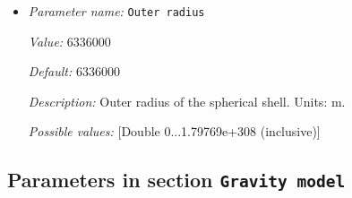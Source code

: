 \begin{itemize}
{\it Default:} 360


{\it Description:} Opening angle in degrees of the section of the shell that we want to build. Units: degrees.


{\it Possible values:} [Double 0...360 (inclusive)]
\item {\it Parameter name:} {\tt Outer radius}
\label{parameters:Geometry model/Spherical shell/Outer radius}


{\it Value:} 6336000


{\it Default:} 6336000


{\it Description:} Outer radius of the spherical shell. Units: m.


{\it Possible values:} [Double 0...1.79769e+308 (inclusive)]
\end{itemize}

\subsection{Parameters in section \tt Gravity model}
\label{parameters:Gravity_20model}

